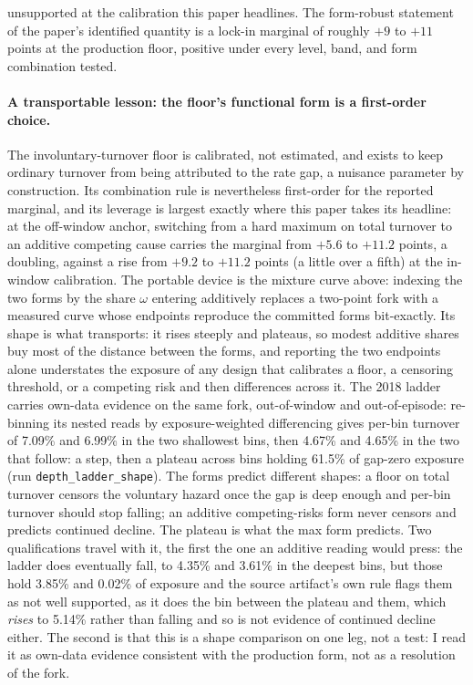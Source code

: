 \documentclass[12pt]{article}
\begin{document}
unsupported at the calibration this paper headlines. The form-robust statement of the paper's identified quantity is a lock-in marginal of roughly $+9$ to $+11$ points at the production floor, positive under every level, band, and form combination tested.

\paragraph{A transportable lesson: the floor's functional form is a first-order choice.} The involuntary-turnover floor is calibrated, not estimated, and exists to keep ordinary turnover from being attributed to the rate gap, a nuisance parameter by construction. Its combination rule is nevertheless first-order for the reported marginal, and its leverage is largest exactly where this paper takes its headline: at the off-window anchor, switching from a hard maximum on total turnover to an additive competing cause carries the marginal from $+5.6$ to $+11.2$ points, a doubling, against a rise from $+9.2$ to $+11.2$ points (a little over a fifth) at the in-window calibration. The portable device is the mixture curve above: indexing the two forms by the share $\omega$ entering additively replaces a two-point fork with a measured curve whose endpoints reproduce the committed forms bit-exactly. Its shape is what transports: it rises steeply and plateaus, so modest additive shares buy most of the distance between the forms, and reporting the two endpoints alone understates the exposure of any design that calibrates a floor, a censoring threshold, or a competing risk and then differences across it. The 2018 ladder carries own-data evidence on the same fork, out-of-window and out-of-episode: re-binning its nested reads by exposure-weighted differencing gives per-bin turnover of 7.09\% and 6.99\% in the two shallowest bins, then 4.67\% and 4.65\% in the two that follow: a step, then a plateau across bins holding 61.5\% of gap-zero exposure (run \texttt{depth\_ladder\_shape}). The forms predict different shapes: a floor on total turnover censors the voluntary hazard once the gap is deep enough and per-bin turnover should stop falling; an additive competing-risks form never censors and predicts continued decline. The plateau is what the max form predicts. Two qualifications travel with it, the first the one an additive reading would press: the ladder does eventually fall, to 4.35\% and 3.61\% in the deepest bins, but those hold 3.85\% and 0.02\% of exposure and the source artifact's own rule flags them as not well supported, as it does the bin between the plateau and them, which \emph{rises} to 5.14\% rather than falling and so is not evidence of continued decline either. The second is that this is a shape comparison on one leg, not a test: I read it as own-data evidence consistent with the production form, not as a resolution of the fork.
\end{document}
